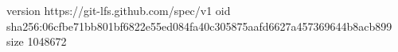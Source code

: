 version https://git-lfs.github.com/spec/v1
oid sha256:06cfbe71bb801bf6822e55ed084fa40c305875aafd6627a457369644b8acb899
size 1048672
